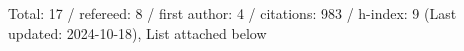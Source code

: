 Total: 17 / refereed: 8 / first author: 4 / citations: 983 / h-index: 9 (Last updated: 2024-10-18), List attached below
